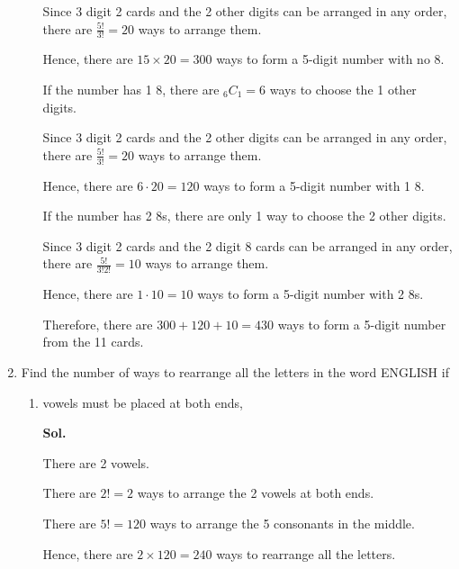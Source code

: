 \documentclass{report}
\newcommand\comb[2][^n]{{}_{#1}C_{#2}}
\newcommand{\sol}[1]{

      \noindent \textbf{Sol.}
}
\def\eos{\quad\hbox{\rlap{\hbox{\vrule depth 1.5pt height 2.6mm width 0.2mm \hskip 1mm \vrule height 2.6mm width 0.2mm}}{\vbox{\hrule height 0.2mm width 1.4mm \vskip 2.8mm \hrule depth 1.5pt height -0.35mm width 1.2mm}}}}
\begin{document}
\begin{multicols*}{2}
\begin{enumerate}
\begin{enumerate}
                              Since 3 digit 2 cards and the 2 other digits can be arranged in any order,
                              there are $\frac{5!}{3!} = 20$ ways to arrange them.

                              Hence, there are $15 \times 20 = 300$ ways to form a 5-digit number with no 8.

                              If the number has 1 8, there are $\comb[6]{1} = 6$ ways to choose the 1 other
                              digits.

                              Since 3 digit 2 cards and the 2 other digits can be arranged in any order,
                              there are $\frac{5!}{3!} = 20$ ways to arrange them.

                              Hence, there are $6 \cdot 20 = 120$ ways to form a 5-digit number with 1 8.

                              If the number has 2 8s, there are only 1 way to choose the 2 other digits.

                              Since 3 digit 2 cards and the 2 digit 8 cards can be arranged in any order,
                              there are $\frac{5!}{3!2!} = 10$ ways to arrange them.

                              Hence, there are $1 \cdot 10 = 10$ ways to form a 5-digit number with 2 8s.

                              Therefore, there are $300 + 120 + 10 = 430$ ways to form a 5-digit number from
                              the 11 cards. $\eos$
                  \end{enumerate}

            \item Find the number of ways to rearrange all the letters in the word ENGLISH if
                  \begin{enumerate}
                        \item vowels must be placed at both ends, \sol{}

                              There are 2 vowels.

                              There are $2! = 2$ ways to arrange the 2 vowels at both ends.

                              There are $5! = 120$ ways to arrange the 5 consonants in the middle.

                              Hence, there are $2 \times 120 = 240$ ways to rearrange all the letters. $\eos$


\end{enumerate}
\end{enumerate}
\end{multicols*}
\end{document}
